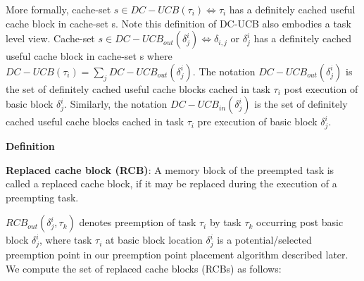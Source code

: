 More formally, cache-set \begin{math}s \in DC-UCB(\tau_{i}) \Leftrightarrow \tau_{i}\end{math} has a definitely cached useful cache block in cache-set s.  Note this definition of DC-UCB also embodies a task level view.  Cache-set \begin{math}s \in DC-UCB_{out}(\delta_{j}^{i}) \Leftrightarrow \delta_{i,j}\end{math} or \begin{math}\delta_{j}^{i}\end{math} has a definitely cached useful cache block in cache-set s where \begin{math}DC-UCB(\tau_{i}) = \sum_{j} DC-UCB_{out}(\delta_{j}^{i})\end{math}. The notation \begin{math}DC-UCB_{out}(\delta_{j}^{i})\end{math} is the set of definitely cached useful cache blocks cached in task \begin{math}\tau_{i}\end{math} post execution of basic block \begin{math}\delta_{j}^{i}\end{math}.  Similarly, the notation \begin{math}DC-UCB_{in}(\delta_{j}^{i})\end{math} is the set of definitely cached useful cache blocks cached in task \begin{math}\tau_{i}\end{math} pre execution of basic block \begin{math}\delta_{j}^{i}\end{math}.

\textbf{Definition}

\textbf{Replaced cache block (RCB)}: A memory block of the preempted task is called a replaced cache block, if it may be replaced during the execution of a preempting task.

\begin{math}RCB_{out}(\delta_{j}^{i},\tau_{k})\end{math} denotes preemption of task \begin{math}\tau_{i}\end{math} by task \begin{math}\tau_{k}\end{math} occurring post basic block \begin{math}\delta_{j}^{i}\end{math}, where task \begin{math}\tau_{i}\end{math} at basic block location \begin{math}\delta_{j}^{i}\end{math} is a potential/selected preemption point in our preemption point placement algorithm described later.  We compute the set of replaced cache blocks (RCBs) as follows:

